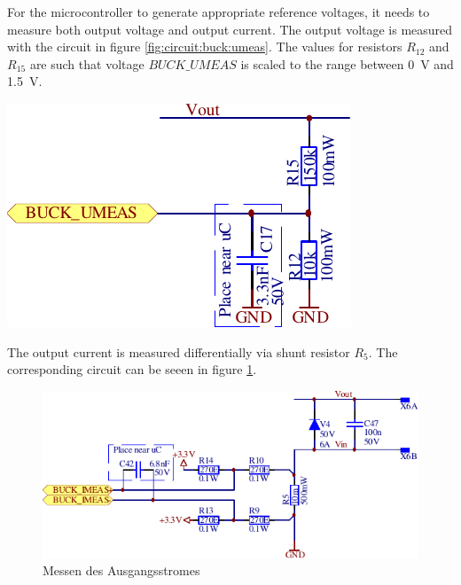 \begin{minipage}{.50\textwidth}
    For  the  microcontroller  to  generate  appropriate  reference  voltages,
    it  needs  to   measure  both  output  voltage   and  output  current. The
    output    voltage   is    measured    with   the    circuit   in    figure
    \ref{fig:circuit:buck:umeas}. The  values   for  resistors   $R_{12}$  and
    $R_{15}$  are such  that  voltage  $BUCK\_UMEAS$ is  scaled  to the  range
    between \SI{0}{\volt} and \SI{1.5}{\volt}.
\end{minipage}
\begin{minipage}{.50\textwidth}
    \center
    \includegraphics[width=.8\textwidth]{images/circuit/buck-umeas.pdf}
    \label{fig:circuit:buck:umeas}
\end{minipage}

The output  current is measured  differentially via shunt  resistor $R_5$. The
corresponding circuit can be seeen in figure \ref{fig:circuit:buck:imeas}.

\begin{figure}[th!]
    \center
    \includegraphics[width=.85\textwidth]{images/circuit/buck-imeas.pdf}
    \caption{Messen des Ausgangsstromes}
    \label{fig:circuit:buck:imeas}
\end{figure}

